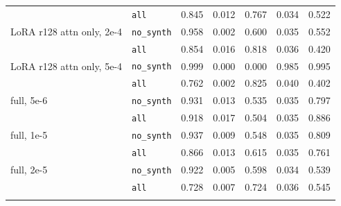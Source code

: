 \begin{longtable}{llrrrrr}
 & \texttt{all} & 0.845 & 0.012 & 0.767 & 0.034 & 0.522 \\
\addlinespace[2pt]
LoRA r128 attn only, 2e-4 & \texttt{no\_synth} & 0.958 & 0.002 & 0.600 & 0.035 & 0.552 \\
 & \texttt{all} & 0.854 & 0.016 & 0.818 & 0.036 & 0.420 \\
\addlinespace[2pt]
LoRA r128 attn only, 5e-4 & \texttt{no\_synth} & 0.999 & 0.000 & 0.000 & 0.985 & 0.995 \\
 & \texttt{all} & 0.762 & 0.002 & 0.825 & 0.040 & 0.402 \\
\addlinespace[2pt]
full, 5e-6 & \texttt{no\_synth} & 0.931 & 0.013 & 0.535 & 0.035 & 0.797 \\
 & \texttt{all} & 0.918 & 0.017 & 0.504 & 0.035 & 0.886 \\
\addlinespace[2pt]
full, 1e-5 & \texttt{no\_synth} & 0.937 & 0.009 & 0.548 & 0.035 & 0.809 \\
 & \texttt{all} & 0.866 & 0.013 & 0.615 & 0.035 & 0.761 \\
\addlinespace[2pt]
full, 2e-5 & \texttt{no\_synth} & 0.922 & 0.005 & 0.598 & 0.034 & 0.539 \\
 & \texttt{all} & 0.728 & 0.007 & 0.724 & 0.036 & 0.545 \\
\addlinespace[2pt]
\end{longtable}
